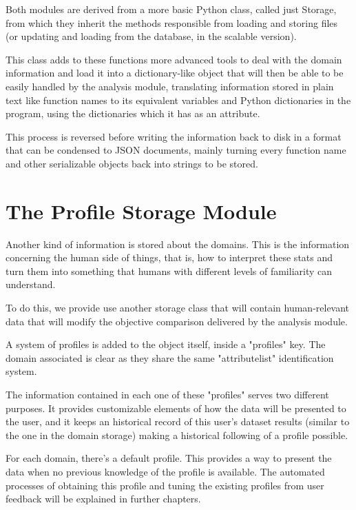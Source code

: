 Both modules are derived from a more basic Python class, called just Storage, from which they inherit the methods responsible from loading and storing files (or updating and loading from the database, in the scalable version).

This class adds to these functions more advanced tools to deal with the domain information and load it into a dictionary-like object that will then be able to be easily handled by the analysis module, translating information stored in plain text like function names to its equivalent variables and Python dictionaries in the program, using the dictionaries which it has as an attribute.

This process is reversed before writing the information back to disk in a format that can be condensed to JSON documents, mainly turning every function name and other serializable objects back into strings to be stored.

\section{The Profile Storage Module}
\label{cap2:sec:profilestorage}

Another kind of information is stored about the domains. This is the information concerning the human side of things, that is, how to interpret these stats and turn them into something that humans with different levels of familiarity can understand.

To do this, we provide use another storage class that will contain human-relevant data that will modify the objective comparison delivered by the analysis module.

A system of profiles is added to the object itself, inside a "profiles" key. The domain associated is clear as they share the same "attributelist" identification system.

The information contained in each one of these "profiles" serves two different purposes. It provides customizable elements of  how  the data will be presented to the user, and it keeps an historical record of this user's dataset results (similar to the one in the domain storage) making a historical following of a profile possible.

For each domain, there's a default profile. This provides a way to present the data when no previous knowledge of the profile is available. The automated processes of obtaining this profile and tuning the existing profiles from user feedback will be explained in further chapters.

